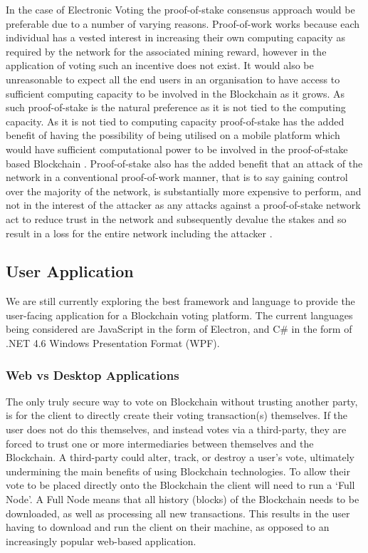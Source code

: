 \documentclass{article}
\begin{document}
\par

In the case of Electronic Voting the proof-of-stake consensus approach would be preferable due to a number of varying reasons. Proof-of-work works because each individual has a vested interest in increasing their own computing capacity as required by the network for the associated mining reward, however in the application of voting such an incentive does not exist. It would also be unreasonable to expect all the end users in an organisation to have access to sufficient computing capacity to be involved in the Blockchain as it grows. As such proof-of-stake is the natural preference as it is not tied to the computing capacity. As it is not tied to computing capacity proof-of-stake has the added benefit of having the possibility of being utilised on a mobile platform which would have sufficient computational power to be involved in the proof-of-stake based Blockchain \parencite{Blockcha72:online}. Proof-of-stake also has the added benefit that an attack of the network in a conventional proof-of-work manner, that is to say gaining control over the majority of the network, is substantially more expensive to perform, and not in the interest of the attacker as any attacks against a proof-of-stake network act to reduce trust in the network and subsequently devalue the stakes and so result in a loss for the entire network including the attacker \parencite{Blockcha72:online}.

\subsection{User Application}

We are still currently exploring the best framework and language to provide the user-facing application for a Blockchain voting platform. The current languages being considered are JavaScript in the form of Electron, and C\# in the form of .NET 4.6 Windows Presentation Format (WPF).

\subsubsection{Web vs Desktop Applications}

The only truly secure way to vote on Blockchain without trusting another party, is for the client to directly create their voting transaction(s) themselves. If the user does not do this themselves, and instead votes via a third-party, they are forced to trust one or more intermediaries between themselves and the Blockchain. A third-party could alter, track, or destroy a user's vote, ultimately undermining the main benefits of using Blockchain technologies. To allow their vote to be placed directly onto the Blockchain the client will need to run a `Full Node'. A Full Node means that all history (blocks) of the Blockchain needs to be downloaded, as well as processing all new transactions. This results in the user having to download and run the client on their machine, as opposed to an increasingly popular web-based application.
\end{document}
